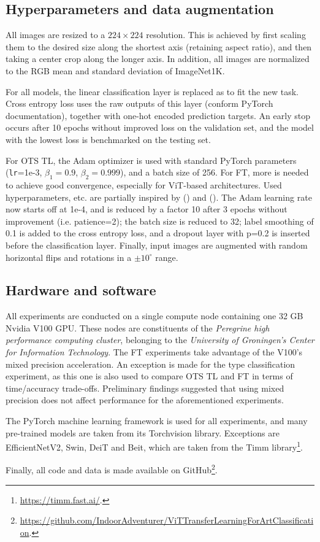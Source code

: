 \subsection{Hyperparameters and data augmentation}
All images are resized to a $224 \times 224$ resolution. This is achieved by first scaling them to the desired size along the shortest axis (retaining aspect ratio), and then taking a center crop along the longer axis. In addition, all images are normalized to the RGB mean and standard deviation of ImageNet1K.

For all models, the linear classification layer is replaced as to fit the new task. Cross entropy loss uses the raw outputs of this layer (conform PyTorch documentation), together with one-hot encoded prediction targets. An early stop occurs after 10 epochs without improved loss on the validation set, and the model with the lowest loss is benchmarked on the testing set.

For OTS TL, the Adam optimizer is used with standard PyTorch parameters (\texttt{lr}=1e-3, $\beta_1=0.9$, $\beta_2=0.999$), and a batch size of 256. For FT, more is needed to achieve good convergence, especially for ViT-based architectures. Used hyperparameters, etc. are partially inspired by \citeauthor{matsoukas2021time} (\citeyear{matsoukas2021time}) and \citeauthor{zhou2021convnets} (\citeyear{zhou2021convnets}). The Adam learning rate now starts off at 1e-4, and is reduced by a factor 10 after 3 epochs without improvement (i.e. patience=2); the batch size is reduced to 32; label smoothing of 0.1 is added to the cross entropy loss, and a dropout layer with p=0.2 is inserted before the classification layer. Finally, input images are augmented with random horizontal flips and rotations in a $\pm 10 ^\circ$ range.

\subsection{Hardware and software}
All experiments are conducted on a single compute node containing one 32 GB Nvidia V100 GPU. These nodes are constituents of the \textit{Peregrine high performance computing cluster}, belonging to the \textit{University of Groningen's Center for Information Technology}. The FT experiments take advantage of the V100's mixed precision acceleration. An exception is made for the type classification experiment, as this one is also used to compare OTS TL and FT in terms of time/accuracy trade-offs. Preliminary findings suggested that using mixed precision does not affect performance for the aforementioned experiments.

The PyTorch machine learning framework is used for all experiments, and many pre-trained models are taken from its Torchvision library. Exceptions are EfficientNetV2, Swin, DeiT and Beit, which are taken from the Timm library\footnote{\url{https://timm.fast.ai/}.}.

Finally, all code and data is made available on GitHub\footnote{\url{https://github.com/IndoorAdventurer/ViTTransferLearningForArtClassification}.}.

